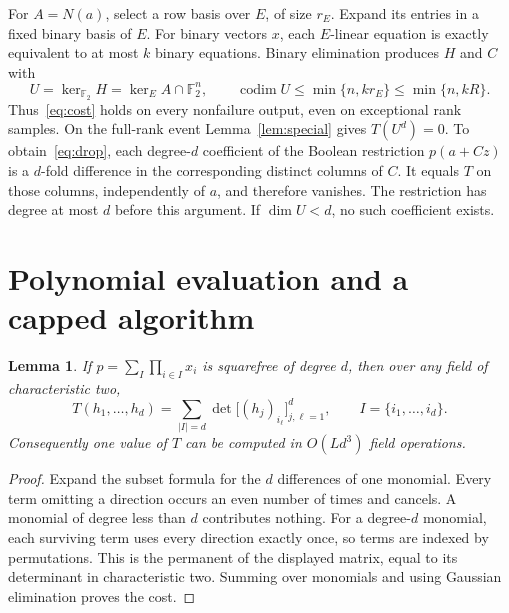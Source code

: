 \documentclass[11pt]{article}
\newtheorem{lemma}[theorem]{Lemma}
\theoremstyle{remark}\newtheorem{remark}[theorem]{Remark}
\newcommand{\F}{\mathbb F}
\newcommand{\codim}{\operatorname{codim}}
\begin{document}
For $A=N(a)$, select a row basis over $E$, of size $r_E$. Expand its entries in a fixed binary basis of $E$. For binary vectors $x$, each $E$-linear equation is exactly equivalent to at most $k$ binary equations. Binary elimination produces $H$ and $C$ with
\[
 U=\ker_{\F_2}H=\ker_E A\cap\F_2^n,\qquad
 \codim U\le\min\{n,kr_E\}\le\min\{n,kR\}.
\]
Thus~\eqref{eq:cost} holds on every nonfailure output, even on exceptional rank samples. On the full-rank event Lemma~\ref{lem:special} gives $T(U^d)=0$.
To obtain~\eqref{eq:drop}, each degree-$d$ coefficient of the Boolean restriction $p(a+Cz)$ is a $d$-fold difference in the corresponding distinct columns of $C$. It equals $T$ on those columns, independently of $a$, and therefore vanishes. The restriction has degree at most $d$ before this argument. If $\dim U<d$, no such coefficient exists.

\section{Polynomial evaluation and a capped algorithm}
\begin{lemma}\label{lem:det}
If $p=\sum_I\prod_{i\in I}x_i$ is squarefree of degree $d$, then over any field of characteristic two,
\begin{equation}\label{eq:det}
 T(h_1,\ldots,h_d)
 =\sum_{|I|=d}\det\bigl[(h_j)_{i_\ell}\bigr]_{j,\ell=1}^d,
 \qquad I=\{i_1,\ldots,i_d\}.
\end{equation}
Consequently one value of $T$ can be computed in $O(Ld^3)$ field operations.
\end{lemma}
\begin{proof}
Expand the subset formula for the $d$ differences of one monomial. Every term omitting a direction occurs an even number of times and cancels. A monomial of degree less than $d$ contributes nothing.
For a degree-$d$ monomial, each surviving term uses every direction exactly once, so terms are indexed by permutations. This is the permanent of the displayed matrix, equal to its determinant in characteristic two. Summing over monomials and using Gaussian elimination proves the cost.
\end{proof}
\end{document}
